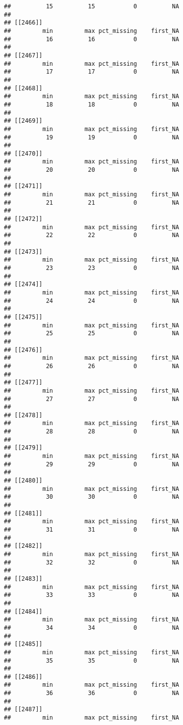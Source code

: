 \documentclass[
]{article}
\begin{document}
\begin{verbatim}
##          15          15           0          NA 
## 
## [[2466]]
##         min         max pct_missing    first_NA 
##          16          16           0          NA 
## 
## [[2467]]
##         min         max pct_missing    first_NA 
##          17          17           0          NA 
## 
## [[2468]]
##         min         max pct_missing    first_NA 
##          18          18           0          NA 
## 
## [[2469]]
##         min         max pct_missing    first_NA 
##          19          19           0          NA 
## 
## [[2470]]
##         min         max pct_missing    first_NA 
##          20          20           0          NA 
## 
## [[2471]]
##         min         max pct_missing    first_NA 
##          21          21           0          NA 
## 
## [[2472]]
##         min         max pct_missing    first_NA 
##          22          22           0          NA 
## 
## [[2473]]
##         min         max pct_missing    first_NA 
##          23          23           0          NA 
## 
## [[2474]]
##         min         max pct_missing    first_NA 
##          24          24           0          NA 
## 
## [[2475]]
##         min         max pct_missing    first_NA 
##          25          25           0          NA 
## 
## [[2476]]
##         min         max pct_missing    first_NA 
##          26          26           0          NA 
## 
## [[2477]]
##         min         max pct_missing    first_NA 
##          27          27           0          NA 
## 
## [[2478]]
##         min         max pct_missing    first_NA 
##          28          28           0          NA 
## 
## [[2479]]
##         min         max pct_missing    first_NA 
##          29          29           0          NA 
## 
## [[2480]]
##         min         max pct_missing    first_NA 
##          30          30           0          NA 
## 
## [[2481]]
##         min         max pct_missing    first_NA 
##          31          31           0          NA 
## 
## [[2482]]
##         min         max pct_missing    first_NA 
##          32          32           0          NA 
## 
## [[2483]]
##         min         max pct_missing    first_NA 
##          33          33           0          NA 
## 
## [[2484]]
##         min         max pct_missing    first_NA 
##          34          34           0          NA 
## 
## [[2485]]
##         min         max pct_missing    first_NA 
##          35          35           0          NA 
## 
## [[2486]]
##         min         max pct_missing    first_NA 
##          36          36           0          NA 
## 
## [[2487]]
##         min         max pct_missing    first_NA 

\end{verbatim}
\end{document}
